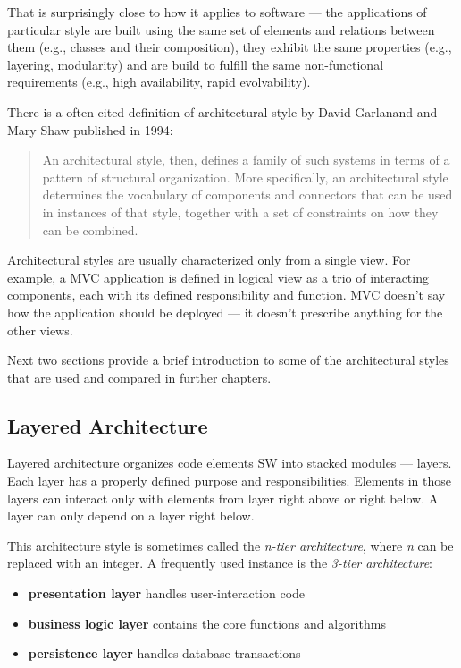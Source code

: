\documentclass[thesis=M,english,hidelinks]{FITthesis}[2012/10/20]
\begin{document}
That is surprisingly close to how it applies to software --- the applications of particular style are built using the same set of elements and relations between them (e.g., classes and their composition), they exhibit the same properties (e.g., layering, modularity) and are build to fulfill the same non-functional requirements (e.g., high availability, rapid evolvability).

There is a often-cited definition of architectural style by David Garlanand and Mary Shaw published in 1994:
\begin{quote}
An architectural style, then, defines a family of such systems in terms of a pattern of structural organization. More specifically, an architectural style determines the vocabulary of components and connectors that can be used in instances of that style, together with a set of constraints on how they can be combined.~\cite{sa-intro-garlan-shaw}
\end{quote}

Architectural styles are usually characterized only from a single view. For example, a \acrfull{MVC} application is defined in logical view as a trio of interacting components, each with its defined responsibility and function. \acrshort{MVC} doesn't say how the application should be deployed --- it doesn't prescribe anything for the other views. 

Next two sections provide a brief introduction to some of the architectural styles that are used and compared in further chapters.

\subsection{Layered Architecture}
Layered architecture organizes code elements \acrshort{SW} into stacked modules --- layers. Each layer has a properly defined purpose and responsibilities. Elements in those layers can interact only with elements from layer right above or right below. A layer can only depend on a layer right below.

This architecture style is sometimes called the \textit{n-tier architecture}, where \textit{n} can be replaced with an integer. A frequently used instance is the \textit{3-tier architecture}:
\begin{itemize}
    \item \textbf{presentation layer} handles user-interaction code
    \item \textbf{business logic layer} contains the core functions and algorithms
    \item \textbf{persistence layer} handles database transactions
\end{itemize}
\end{document}
